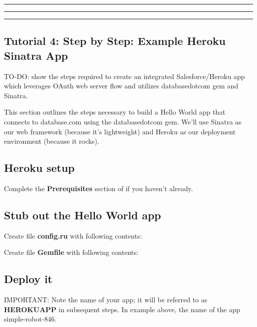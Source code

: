 \documentclass{article}
\begin{document}
\vspace{.5em} \hrule \vspace{.5em}

\vspace{.5em} \hrule \vspace{.5em}

\vspace{.5em} \hrule \vspace{.5em}
\hypertarget{tutorial_4_step_by_step_example_heroku_sinatra_app}{}\subsection*{{Tutorial 4: Step by Step: Example Heroku Sinatra App}}\label{tutorial_4_step_by_step_example_heroku_sinatra_app}

TO-DO: show the steps required to create an integrated Salesforce/Heroku app which leverages OAuth web server flow and utilizes databasedotcom gem and Sinatra.

This section outlines the steps necessary to build a Hello World app that connects to database.com using the databasedotcom gem. We'{}ll use Sinatra as our web framework (because it'{}s lightweight) and Heroku as our deployment environment (because it rocks).

\hypertarget{heroku_setup}{}\subsection*{{Heroku setup}}\label{heroku_setup}

Complete the \textbf{\textbf{Prerequisites}} section of  if you haven'{}t already.

\hypertarget{stub_out_the_hello_world_app}{}\subsection*{{Stub out the Hello World app}}\label{stub_out_the_hello_world_app}

Create file \textbf{config.ru} with following contents:

Create file \textbf{Gemfile} with following contents:

\hypertarget{deploy_it}{}\subsection*{{Deploy it}}\label{deploy_it}

IMPORTANT: Note the name of your app; it will be referred to as \textbf{HEROKUAPP} in subsequent steps. In example above, the name of the app simple-robot-846.
\end{document}
